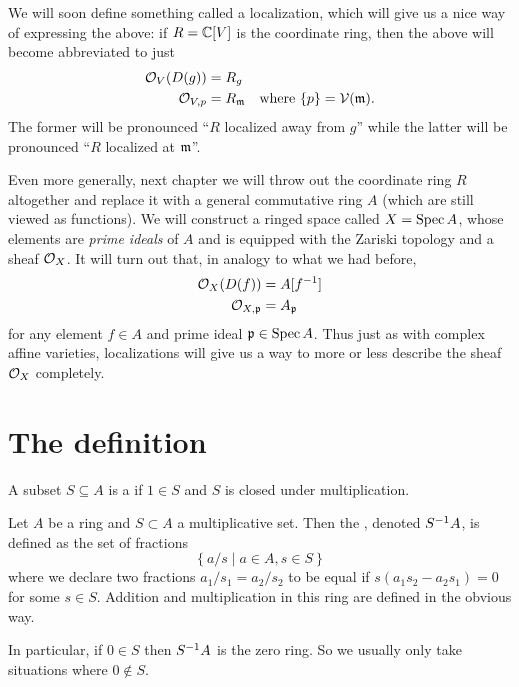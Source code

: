We will soon define something called a localization,
which will give us a nice way of expressing the above:
if $R = \mathbb C[V]$ is the coordinate ring, then
the above will become abbreviated to just
\begin{align*}
	\mathcal O_{V}(D(g)) &= R_{g} \\
	\mathcal O_{V, p} &= R_{\mathfrak m} \quad \text{where } \{p\} = \mathcal V(\mathfrak m).
\end{align*}
The former will be pronounced
``$R$ localized away from $g$''
while the latter will be pronounced
``$R$ localized at $\mathfrak m$''.

Even more generally,
next chapter we will throw out the coordinate ring $R$
altogether and replace it with a general commutative ring $A$
(which are still viewed as functions).
We will construct a ringed space called $X = \operatorname{Spec} A$,
whose elements are \emph{prime ideals} of $A$
and is equipped with the Zariski topology and a sheaf $\mathcal O_X$.
It will turn out that, in analogy to what we had before,
\begin{align*}
	\mathcal O_X(D(f)) &= A[f^{-1}] \\
	\mathcal O_{X,\mathfrak p} &= A_\mathfrak p
\end{align*}
for any element $f \in A$ and prime ideal $\mathfrak p \in \operatorname{Spec} A$.
Thus just as with complex affine varieties,
localizations will give us a way to more or less
describe the sheaf $\mathcal O_X$ completely.

\section{The definition}
\begin{definition}
	A subset $S \subseteq A$ is a 
	if $1 \in S$ and $S$ is closed under multiplication.
\end{definition}
\begin{definition}
	Let $A$ be a ring and $S \subset A$ a multiplicative set.
	Then the , denoted $S^{-1} A$,
	is defined as the set of fractions
	\[ \left\{ a/s \mid a \in A, s \in S \right\} \]
	where we declare two fractions $a_1 / s_1 = a_2 / s_2$
	to be equal if $s(a_1s_2 - a_2s_1) = 0$ for some $s \in S$.
	Addition and multiplication in this ring
	are defined in the obvious way.
\end{definition}
In particular, if $0 \in S$ then $S^{-1} A$ is the zero ring.
So we usually only take situations where $0 \notin S$.

